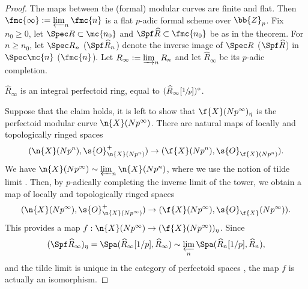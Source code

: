 \begin{proof}
The maps between the (formal) modular curves are finite and flat. Then $\fmc{\infty}:=\varprojlim_{n} \fmc{n}$ is a flat $p$-adic formal scheme over $\bb{Z}_p$. Fix $n_0\geq 0$, let $\Spec R\subset \mc{n_0}$ and $\Spf \widehat{R}\subset \fmc{n_0}$ be as in the theorem. For $n\geq n_0$, let $\Spec R_n$ (\resp $\Spf \widehat{R}_n$) denote the inverse image of $\Spec R$ (\resp $\Spf \widehat{R}$) in $\Spec \mc{n}$ (\resp $\fmc{n}$). Let $R_{\infty}:=\varinjlim_n R_n$ and let $\widehat{R}_{\infty}$ be its $p$-adic completion.

\begin{claim} $\widehat{R}_{\infty}$ is an integral perfectoid ring, equal to $(\widehat{R}_{\infty}[\sfrac{1}{p}])^{\circ}$.
\end{claim}

Suppose that the claim holds, it is left to show that $\f{X}(Np^\infty)_{\eta}$ is the perfectoid modular curve $\n{X}(Np^\infty)$. There are natural maps of locally and topologically ringed spaces
\[(\n{X}(Np^n), \s{O}^+_{\n{X}(Np^n)})\to (\f{X}(Np^n), \s{O}_{\f{X}(Np^n)}).\]
We have $\n{X}(Np^{\infty})\sim \varprojlim_n \n{X}(Np^n)$, where we use the notion of tilde limit \cite[Def.\,2.4.1]{scholze2013moduli}. Then, by $p$-adically completing the inverse limit of the tower, we obtain a map of locally and topologically ringed spaces
\[
(\n{X}(Np^\infty), \s{O}^+_{\n{X}(Np^\infty)})\to (\f{X}(Np^\infty),\s{O}_{\f{X}}(Np^\infty)).
\]
This provides a map $f:\n{X}(Np^\infty)\to (\f{X}(Np^\infty))_{\eta}$. Since
\[
(\Spf \widehat{R}_{\infty})_{\eta} =\Spa(\widehat{R}_\infty[1/p], \widehat{R}_{\infty})\sim \varprojlim_n \Spa(\widehat{R}_n[1/p], \widehat{R}_{n}),
\]
and the tilde limit is unique in the category of perfectoid spaces \cite[Prop.\,2.4.5]{scholze2013moduli}, the map $f$ is actually an isomorphism.
\end{proof}

